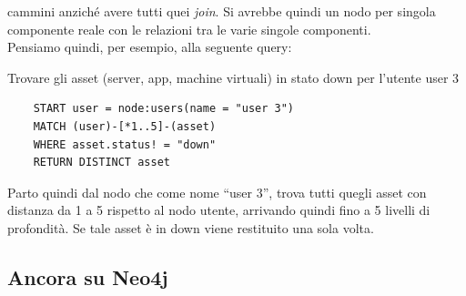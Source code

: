 \documentclass[a4paper,12pt, oneside]{book}
\begin{document}
\begin{esempio}
  cammini anziché avere tutti quei \textit{join}. Si avrebbe quindi un nodo per
  singola componente reale con le relazioni tra le varie singole componenti. \\
  Pensiamo quindi, per esempio, alla seguente query:
  \begin{center}
    Trovare gli asset (server, app, machine virtuali) in stato down per l’utente
    user 3
  \end{center}
  \begin{verbatim}
    START user = node:users(name = "user 3")
    MATCH (user)-[*1..5]-(asset)
    WHERE asset.status! = "down"
    RETURN DISTINCT asset
  \end{verbatim}
  Parto quindi dal nodo che come nome ``user 3'', trova tutti quegli asset con
  distanza da 1 a 5 rispetto al nodo utente, arrivando quindi fino a 5 livelli
  di profondità. Se tale asset è in down viene restituito una sola volta.
\end{esempio}
\subsection{Ancora su Neo4j}
\end{document}
